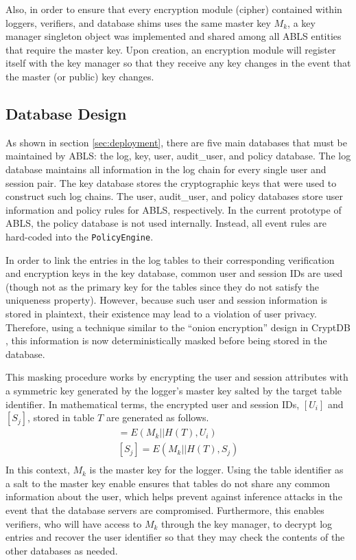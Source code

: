 \documentclass{sig-alternate}
\begin{document}
Also, in order to ensure that every encryption module (cipher) contained within loggers, verifiers, and database 
shims uses the same master key $M_k$, a key manager singleton object was implemented and shared among
all ABLS entities that require the master key. Upon creation, an encryption module will register itself with the key
manager so that they receive any key changes in the event that the master (or public) key changes.

\subsection{Database Design}
\label{sec:databaseDesign}

As shown in section \ref{sec:deployment}, there are five main databases that must be maintained by ABLS:
the log, key, user, audit\_user, and policy database. The log database maintains all information in the log chain for every 
single user and session pair. The key database stores the cryptographic keys that were used to construct
such log chains. The user, audit\_user, and policy databases store user information and policy rules for ABLS, respectively. 
In the current prototype of ABLS, the policy database is not used internally. Instead, all event rules are 
hard-coded into the {\tt PolicyEngine}. 

In order to link the entries in the log tables to their corresponding verification and encryption keys in the key database,
common user and session IDs are used (though not as the primary key for the tables since they do not satisfy
the uniqueness property). However, because such user and session information is stored in plaintext, their 
existence may lead to a violation of user privacy. Therefore, using a technique similar to the ``onion encryption'' design in
CryptDB \cite{Popa2012-CryptDB}, this information is now deterministically masked before being stored in the database.

This masking procedure works by encrypting the user and session attributes with a symmetric key generated
by the logger's master key salted by the target table identifier. In mathematical
terms, the encrypted user and session IDs, $[U_i]$ and $[S_j]$, stored in table $T$ are generated as follows.
\begin{align*}
[U_i] = E(M_k || H(T), U_i) \\
[S_j] = E(M_k || H(T), S_j) \\
\end{align*}
In this context, $M_k$ is the master key for the logger. Using the table identifier as a salt to the master key 
enable ensures that tables do not share any common information about the user, which helps prevent against 
inference attacks in the event that the database servers are compromised. Furthermore, this enables verifiers,
who will have access to $M_k$ through the key manager, to decrypt log entries and recover the user identifier 
so that they may check the contents of the other databases as needed.
\end{document}
